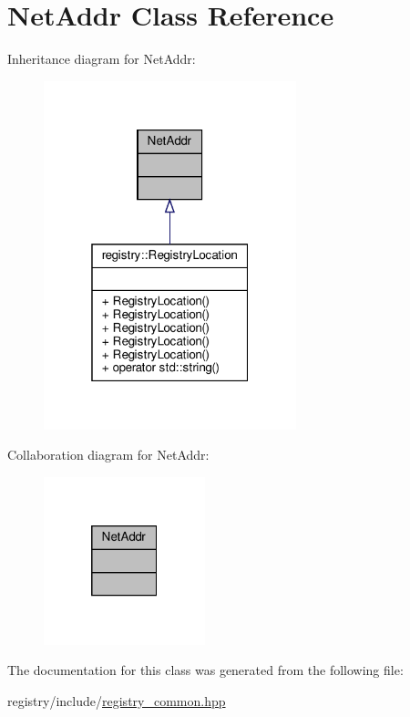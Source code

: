 \hypertarget{classNetAddr}{}\section{Net\+Addr Class Reference}
\label{classNetAddr}


Inheritance diagram for Net\+Addr\+:\nopagebreak
\begin{figure}[H]
\begin{center}
\leavevmode
\includegraphics[width=208pt]{classNetAddr__inherit__graph}
\end{center}
\end{figure}


Collaboration diagram for Net\+Addr\+:\nopagebreak
\begin{figure}[H]
\begin{center}
\leavevmode
\includegraphics[width=133pt]{classNetAddr__coll__graph}
\end{center}
\end{figure}


The documentation for this class was generated from the following file\+:\begin{DoxyCompactItemize}
\item 
registry/include/\hyperlink{registry__common_8hpp}{registry\+\_\+common.\+hpp}\end{DoxyCompactItemize}
